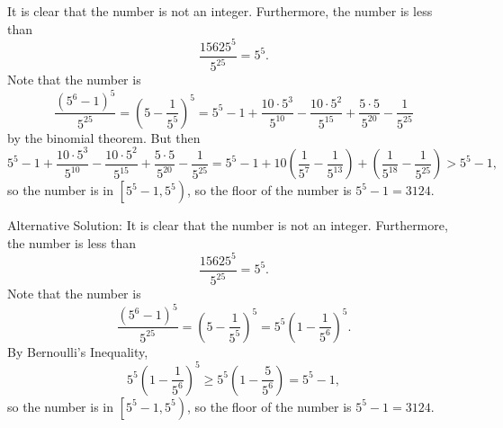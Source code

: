 It is clear that the number is not an integer. Furthermore, the number is less than \[\frac{15625^5}{5^{25}}=5^5.\] Note that the number is \[\frac{\left(5^6-1\right)^5}{5^{25}}=\left(5-\frac{1}{5^5}\right)^5=5^5-1+\frac{10\cdot5^3}{5^{10}}-\frac{10\cdot5^2}{5^{15}}+\frac{5\cdot5}{5^{20}}-\frac{1}{5^{25}}\] by the binomial theorem. But then \[5^5-1+\frac{10\cdot5^3}{5^{10}}-\frac{10\cdot5^2}{5^{15}}+\frac{5\cdot5}{5^{20}}-\frac{1}{5^{25}}=5^5-1+10\left(\frac{1}{5^7}-\frac{1}{5^{13}}\right)+\left(\frac{1}{5^{18}}-\frac{1}{5^{25}}\right)>5^5-1,\] so the number is in $\left[5^5-1,5^5\right)$, so the floor of the number is $5^5-1=\boxed{3124}$.

Alternative Solution: It is clear that the number is not an integer. Furthermore, the number is less than \[\frac{15625^5}{5^{25}}=5^5.\] Note that the number is \[\frac{\left(5^6-1\right)^5}{5^{25}}=\left(5-\frac{1}{5^5}\right)^5=5^5\left(1-\frac{1}{5^6}\right)^5.\] By Bernoulli's Inequality, \[5^5\left(1-\frac{1}{5^6}\right)^5\geq5^5\left(1-\frac{5}{5^6}\right)=5^5-1,\] so the number is in $\left[5^5-1,5^5\right)$, so the floor of the number is $5^5-1=\boxed{3124}$.